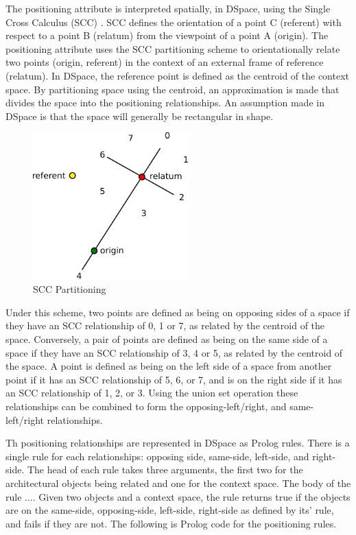 \documentclass[12pt]{ucthesis}
\begin{document}
The positioning attribute is interpreted spatially, in DSpace, using the Single Cross Calculus (SCC) \cite{Freksa92usingorientation}. SCC defines the orientation of a point C (referent) with respect to a point B (relatum) from the viewpoint of a point A (origin). The positioning attribute uses the SCC partitioning scheme to orientationally relate two points (origin, referent) in the context of an external frame of reference (relatum). In DSpace, the reference point is defined as the centroid of the context space. By partitioning space using the centroid, an approximation is made that divides the space into the positioning relationships. An assumption made in DSpace is that the space will generally be rectangular in shape.

\begin{figure}[H]
\centering
\includegraphics[width=60mm]{scc}
\caption{SCC Partitioning}
\label{scc}
\end{figure}

Under this scheme, two points are defined as being on opposing sides of a space if they have an SCC relationship of 0, 1 or 7, as related by the centroid of the space. Conversely, a pair of points are defined as being on the same side of a space if they have an SCC relationship of 3, 4 or 5, as related by the centroid of the  space. A point is defined as being on the left side of a space from another point if it has an SCC relationship of 5, 6, or 7, and is on the right side if it has an SCC relationship of 1, 2, or 3. Using the union set operation these relationships can be combined to form the opposing-left/right, and same-left/right relationships.

Th positioning relationships are represented in DSpace as Prolog rules. There is a single rule for each relationships: opposing side, same-side, left-side, and right-side. The head of each rule takes three arguments, the first two for the architectural objects being related and one for the context space. The body of the rule .... Given two objects and a context space, the rule returns true if the objects are on the same-side, opposing-side, left-side, right-side as defined by its' rule, and fails if they are not. The following is Prolog code for the positioning rules.
\end{document}
